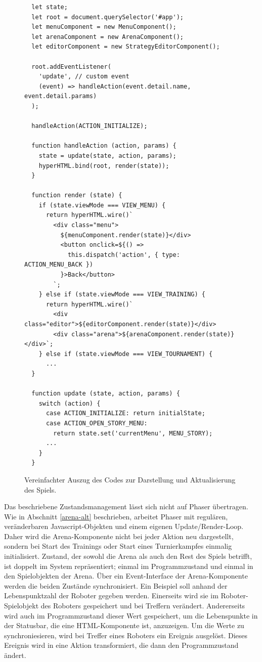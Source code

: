 \begin{figure}
  \caption{Vereinfachter Auszug des Codes zur Darstellung und Aktualisierung des Spiels.}

  \label{update-loop}

  \begin{lstlisting}
  let state;
  let root = document.querySelector('#app');
  let menuComponent = new MenuComponent();
  let arenaComponent = new ArenaComponent();
  let editorComponent = new StrategyEditorComponent();

  root.addEventListener(
    'update', // custom event
    (event) => handleAction(event.detail.name, event.detail.params)
  );

  handleAction(ACTION_INITIALIZE);

  function handleAction (action, params) {
    state = update(state, action, params);
    hyperHTML.bind(root, render(state));
  }

  function render (state) {
    if (state.viewMode === VIEW_MENU) {
      return hyperHTML.wire()`
        <div class="menu">
          ${menuComponent.render(state)}</div>
          <button onclick=${() => 
            this.dispatch('action', { type: ACTION_MENU_BACK })
          }>Back</button>
        `;
    } else if (state.viewMode === VIEW_TRAINING) {
      return hyperHTML.wire()`
        <div class="editor">${editorComponent.render(state)}</div>
        <div class="arena">${arenaComponent.render(state)}</div>`;
    } else if (state.viewMode === VIEW_TOURNAMENT) {
      ...
  }

  function update (state, action, params) {
    switch (action) {
      case ACTION_INITIALIZE: return initialState;
      case ACTION_OPEN_STORY_MENU:
        return state.set('currentMenu', MENU_STORY);
      ...
    }
  }
  \end{lstlisting}
\end{figure}

Das beschriebene Zustandsmanagement lässt sich nicht auf Phaser übertragen. Wie in Abschnitt
\ref{arena-alt} beschrieben, arbeitet Phaser mit regulären, veränderbaren Javascript-Objekten und
einem eigenen Update/Render-Loop. Daher wird die Arena-Komponente nicht bei jeder Aktion neu
dargestellt, sondern bei Start des Trainings oder Start eines Turnierkampfes einmalig initialisiert.
Zustand, der sowohl die Arena als auch den Rest des Spiels betrifft, ist doppelt im System
repräsentiert; einmal im Programmzustand und einmal in den Spielobjekten der Arena. Über ein
Event-Interface der Arena-Komponente werden die beiden Zustände synchronisiert. Ein Beispiel soll
anhand der Lebenspunktzahl der Roboter gegeben werden. Einerseits wird sie im Roboter-Spielobjekt
des Roboters gespeichert und bei Treffern verändert. Andererseits wird auch im Programmzustand
dieser Wert gespeichert, um die Lebenspunkte in der Statusbar, die eine HTML-Komponente ist,
anzuzeigen. Um die Werte zu synchroniesieren, wird bei Treffer eines Roboters ein Ereignis
ausgelöst. Dieses Ereignis wird in eine Aktion transformiert, die dann den Programmzustand ändert.


